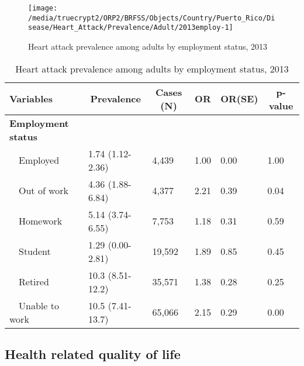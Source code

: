 \begin{figure}[H]
\caption{Heart attack prevalence among adults by employment status, 
         2013}
\label{fig:employ.Heart_Attack.2013}
\begin{knitrout}
\color{fgcolor}

{\centering \texttt{[image: /media/truecrypt2/ORP2/BRFSS/Objects/Country/Puerto\_Rico/Disease/Heart\_Attack/Prevalence/Adult/2013employ-1]} 

}



\end{knitrout}
 \end{figure}

\begin{table}[H]
\caption{Heart attack prevalence  among adults by employment status, 2013\label{tab:employ.Heart_Attack.2013}} 
\begin{center}
\begin{tabular}{llllll}
\hline\hline
\multicolumn{1}{l}{Variables}&\multicolumn{1}{c}{Prevalence}&\multicolumn{1}{c}{Cases (N)}&\multicolumn{1}{c}{OR}&\multicolumn{1}{c}{OR(SE)}&\multicolumn{1}{c}{p-value}\tabularnewline
\hline
{\bfseries Employment status}&&&&&\tabularnewline
~~Employed&1.74 (1.12-2.36)& 4,439&1.00&0.00&1.00\tabularnewline
~~Out of work&4.36 (1.88-6.84)& 4,377&2.21&0.39&0.04\tabularnewline
~~Homework&5.14 (3.74-6.55)& 7,753&1.18&0.31&0.59\tabularnewline
~~Student&1.29 (0.00-2.81)&19,592&1.89&0.85&0.45\tabularnewline
~~Retired&10.3 (8.51-12.2)&35,571&1.38&0.28&0.25\tabularnewline
~~Unable to work&10.5 (7.41-13.7)&65,066&2.15&0.29&0.00\tabularnewline
\hline
\end{tabular}\end{center}

\end{table}


 \newpage
\subsection{Health related quality of life}


